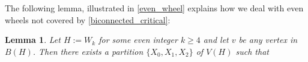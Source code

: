 \documentclass[a4paper,UKenglish, cleveref, autoref, thm-restate]{lipics-v2021}
\newtheorem{lem}{Lemma}
\begin{document}
  

The following lemma, illustrated in \cref{even_wheel}
 explains how we deal with even wheels not covered by \cref{biconnected_critical}:

\begin{lem}\label{wheelie}
  Let $H:=W_k$ for some even integer $k\ge 4$ and let $v$ be any vertex in $B(H)$.  Then there exists a partition $\{X_0,X_1,X_2\}$ of $V(H)$ such that
\end{lem}
\end{document}
